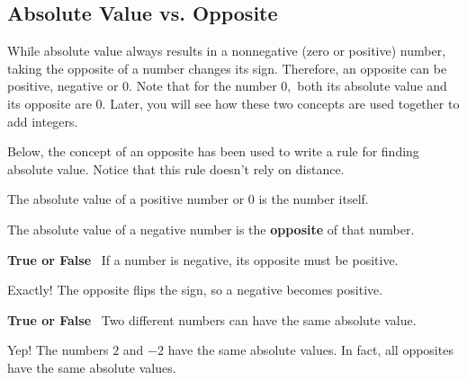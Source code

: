 \documentclass{ximera}[font=12pt]
\begin{document}
\subsection*{Absolute Value vs. Opposite}

While absolute value always results in a nonnegative (zero or positive) number, taking the opposite of a number 
changes its sign.  Therefore, an opposite can be positive, negative or $0.$  Note that for the number $0,$ both 
its absolute value and its opposite are $0.$  Later, you will see how these two concepts are used together to add integers.

Below, the concept of an opposite has been used to write a rule for finding absolute value.  Notice that this rule 
doesn't rely on distance.

\begin{procedure}
\begin{description}[style=nextline, leftmargin=0pt, font=\bfseries]
    \item[Positive Numbers and $0$:]
    The absolute value of a positive number or $0$ is the number itself.
    \item[Negative Numbers:]
    The absolute value of a negative number is the \textbf{opposite} of that number.
\end{description}
\end{procedure}

\begin{problem}
\textcolor{orange!80!black}{\textbf{True or False}} \ If a number is negative, its opposite must be positive.

\begin{multipleChoice}
\end{multipleChoice}

\begin{feedback}[correct]
Exactly! The opposite flips the sign, so a negative becomes positive.
\end{feedback}

\end{problem}

\begin{problem}
\textcolor{orange!80!black}{\textbf{True or False}} \ Two different numbers can have the same absolute value.

\begin{multipleChoice}
\end{multipleChoice}

\begin{feedback}[correct]
Yep! The numbers $2$ and $-2$ have the same absolute values.  In fact, all opposites have the same absolute values.
\end{feedback}

\end{problem}
\end{document}
